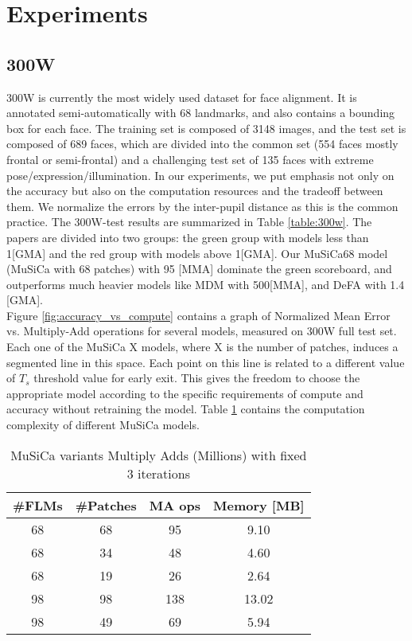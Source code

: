 \documentclass[twocolumn]{article}
\begin{document}
\section{Experiments}
\subsection{300W}


300W \cite{sagonas2013300} is currently the most widely used dataset for face alignment. It is annotated semi-automatically with 68 landmarks, and also contains a bounding box for each face. The training set is composed of 3148 images, and the test set is composed of 689 faces, which are divided into the common set (554 faces mostly frontal or semi-frontal) and a challenging test set of 135 faces with extreme pose/expression/illumination. In our experiments, we put emphasis not only on the accuracy but also on the computation resources and the tradeoff between them. We normalize the errors by the inter-pupil distance as this is the common practice. The 300W-test results are summarized in Table \ref{table:300w}. The papers are divided into two groups: the green group with models less than 1[GMA] and the red group with models above 1[GMA]. Our MuSiCa68 model (MuSiCa with 68 patches) with 95 [MMA] dominate the green scoreboard, and outperforms much heavier models like MDM \cite{trigeorgis2016mnemonic} with 500[MMA], and DeFA \cite{liu2017dense} with 1.4 [GMA]. \\
Figure \ref{fig:accuracy_vs_compute} contains a graph of Normalized Mean Error vs. Multiply-Add operations for several models, measured on 300W full test set. Each one of the MuSiCa X models, where X is the number of patches, induces a segmented line in this space. Each point on this line is related to a different value of $T_{s}$ threshold value for early exit. This gives the freedom to choose the appropriate model according to the specific requirements of compute and accuracy without retraining the model. Table \ref{table:musica_complexity} contains the computation complexity of different MuSiCa models.

\begin{table}[]
\centering
\small
\begin{tabular}{@{}cccc@{}}

\toprule
\#FLMs & \#Patches & MA ops & Memory [MB]\\ \midrule
68     & 68        & 95     & 9.10\\
68     & 34        & 48     & 4.60\\
68     & 19        & 26     & 2.64\\
98     & 98        & 138    & 13.02\\
98     & 49        & 69     & 5.94\\ \bottomrule
\end{tabular}
\caption{MuSiCa variants Multiply Adds (Millions) with fixed 3 iterations}
\label{table:musica_complexity}
\end{table}
\end{document}
